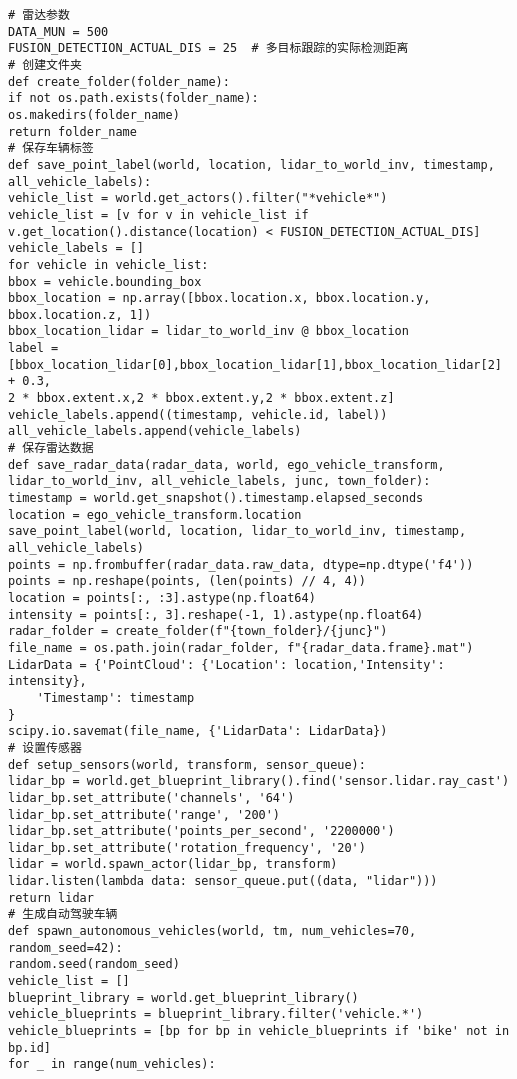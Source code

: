 \begin{lstlisting}
# 雷达参数
DATA_MUN = 500
FUSION_DETECTION_ACTUAL_DIS = 25  # 多目标跟踪的实际检测距离
# 创建文件夹
def create_folder(folder_name):
if not os.path.exists(folder_name):
os.makedirs(folder_name)
return folder_name
# 保存车辆标签
def save_point_label(world, location, lidar_to_world_inv, timestamp, all_vehicle_labels):
vehicle_list = world.get_actors().filter("*vehicle*")
vehicle_list = [v for v in vehicle_list if v.get_location().distance(location) < FUSION_DETECTION_ACTUAL_DIS]
vehicle_labels = []
for vehicle in vehicle_list:
bbox = vehicle.bounding_box
bbox_location = np.array([bbox.location.x, bbox.location.y, bbox.location.z, 1])
bbox_location_lidar = lidar_to_world_inv @ bbox_location
label = [bbox_location_lidar[0],bbox_location_lidar[1],bbox_location_lidar[2] + 0.3,
2 * bbox.extent.x,2 * bbox.extent.y,2 * bbox.extent.z]
vehicle_labels.append((timestamp, vehicle.id, label))
all_vehicle_labels.append(vehicle_labels)
# 保存雷达数据
def save_radar_data(radar_data, world, ego_vehicle_transform, lidar_to_world_inv, all_vehicle_labels, junc, town_folder):
timestamp = world.get_snapshot().timestamp.elapsed_seconds
location = ego_vehicle_transform.location
save_point_label(world, location, lidar_to_world_inv, timestamp, all_vehicle_labels)
points = np.frombuffer(radar_data.raw_data, dtype=np.dtype('f4'))
points = np.reshape(points, (len(points) // 4, 4))
location = points[:, :3].astype(np.float64)
intensity = points[:, 3].reshape(-1, 1).astype(np.float64)
radar_folder = create_folder(f"{town_folder}/{junc}")
file_name = os.path.join(radar_folder, f"{radar_data.frame}.mat")
LidarData = {'PointCloud': {'Location': location,'Intensity': intensity},
	'Timestamp': timestamp
}
scipy.io.savemat(file_name, {'LidarData': LidarData})
# 设置传感器
def setup_sensors(world, transform, sensor_queue):
lidar_bp = world.get_blueprint_library().find('sensor.lidar.ray_cast')
lidar_bp.set_attribute('channels', '64')
lidar_bp.set_attribute('range', '200')
lidar_bp.set_attribute('points_per_second', '2200000')
lidar_bp.set_attribute('rotation_frequency', '20')
lidar = world.spawn_actor(lidar_bp, transform)
lidar.listen(lambda data: sensor_queue.put((data, "lidar")))
return lidar
# 生成自动驾驶车辆
def spawn_autonomous_vehicles(world, tm, num_vehicles=70, random_seed=42):
random.seed(random_seed)
vehicle_list = []
blueprint_library = world.get_blueprint_library()
vehicle_blueprints = blueprint_library.filter('vehicle.*')
vehicle_blueprints = [bp for bp in vehicle_blueprints if 'bike' not in bp.id]
for _ in range(num_vehicles):

\end{lstlisting}
